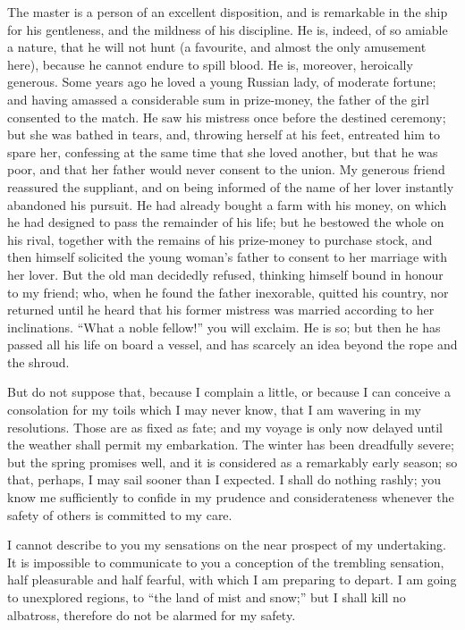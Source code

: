 The master is a person of an excellent
disposition, and is remarkable in
the ship for his gentleness, and the
mildness of his discipline. He is, indeed,
of so amiable a nature, that he
will not hunt (a favourite, and almost
the only amusement here), because he
cannot endure to spill blood. He is,
moreover, heroically generous. Some
years ago he loved a young Russian
lady, of moderate fortune; and having
amassed a considerable sum in prize-money,
the father of the girl consented
to the match. He saw his mistress
once before the destined ceremony; but
she was bathed in tears, and, throwing
herself at his feet, entreated him to
spare her, confessing at the same time
that she loved another, but that he was
poor, and that her father would never
consent to the union. My generous
friend reassured the suppliant, and on
being informed of the name of her lover
instantly abandoned his pursuit. He had
already bought a farm with his money,
on which he had designed to pass the remainder
of his life; but he bestowed
the whole on his rival, together with
the remains of his prize-money to purchase
stock, and then himself solicited
the young woman's father to consent
to her marriage with her lover. But
the old man decidedly refused, thinking
himself bound in honour to
my friend; who, when he found the
father inexorable, quitted his country,
nor returned until he heard that his
former mistress was married according
to her inclinations. ``What a noble
fellow!'' you will exclaim. He is so;
but then he has passed all his life on
board a vessel, and has scarcely an
idea beyond the rope and the shroud.

But do not suppose that, because I
complain a little, or because I can conceive
a consolation for my toils which I
may never know, that I am wavering
in my resolutions. Those are as fixed
as fate; and my voyage is only now
delayed until the weather shall permit
my embarkation. The winter has been
dreadfully severe; but the spring promises
well, and it is considered as a remarkably
early season; so that, perhaps,
I may sail sooner than I expected.
I shall do nothing rashly;
you know me sufficiently to confide in
my prudence and considerateness whenever
the safety of others is committed
to my care.

I cannot describe to you my sensations
on the near prospect of my undertaking.
It is impossible to communicate
to you a conception of the trembling
sensation, half pleasurable and
half fearful, with which I am preparing
to depart. I am going to unexplored
regions, to ``the land of mist and
snow;'' but I shall kill no albatross,
therefore do not be alarmed for my
safety.

